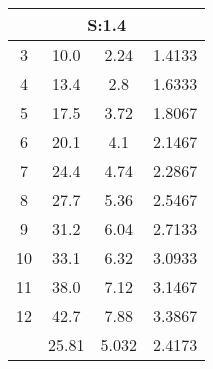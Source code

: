 
\begin{table}[H]
\begin{tabular}{c|ccc}
\multicolumn{4}{c}{S:1.4}\\\hline
3 & 10.0 & 2.24 & 1.4133\\
4 & 13.4 & 2.8 & 1.6333\\
5 & 17.5 & 3.72 & 1.8067\\
6 & 20.1 & 4.1 & 2.1467\\
7 & 24.4 & 4.74 & 2.2867\\
8 & 27.7 & 5.36 & 2.5467\\
9 & 31.2 & 6.04 & 2.7133\\
10 & 33.1 & 6.32 & 3.0933\\
11 & 38.0 & 7.12 & 3.1467\\
12 & 42.7 & 7.88 & 3.3867\\
\hline
& 25.81 & 5.032 & 2.4173\\
\end{tabular}
\end{table}